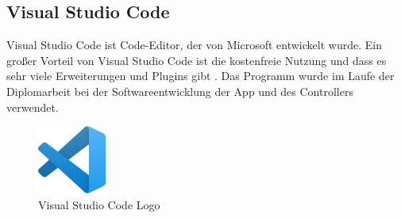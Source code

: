 ﻿\subsection{Visual Studio Code}
\label{sec:vscode}

Visual Studio Code ist Code-Editor, der von Microsoft entwickelt wurde. Ein großer Vorteil von Visual Studio Code ist die kostenfreie Nutzung und dass es sehr viele Erweiterungen und Plugins gibt . Das Programm wurde im Laufe der Diplomarbeit bei der Softwareentwicklung der App und des Controllers verwendet.

\begin{figure}[H]
  \centering
  \includegraphics[width=0.2\textwidth]{images/vscodelogo.png}
  \caption{Visual Studio Code Logo }
  \label{fig:vscodelogo}
\end{figure}